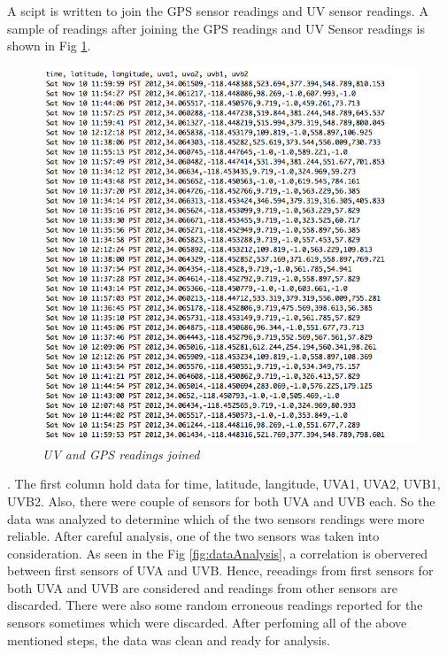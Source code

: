 \documentclass[12pt,fullpage,doublespace]{article}
\begin{document}
A scipt is written to join the GPS sensor readings and UV sensor readings. A sample of readings after joining the GPS readings and UV Sensor readings is shown in Fig \ref{fig:joinedReadings}.\begin{figure}
\begin{center}
\includegraphics[scale=0.45]{joinedReadings.png}
\caption{\small \sl UV and GPS readings joined\label{fig:joinedReadings}}
\end{center}
\end{figure}. The first column hold data for time, latitude, langitude, UVA1, UVA2, UVB1, UVB2. Also, there were couple of sensors for both UVA and UVB each. So the data was analyzed to determine which of the two sensors readings were more reliable. After careful analysis, one of the two sensors was taken into consideration. As seen in the Fig \ref{fig:dataAnalysis}, a correlation is obervered between first sensors of UVA and UVB. Hence, reeadings from first sensors for both UVA and UVB are considered and readings from other sensors are discarded. There were also some random erroneous readings reported for the sensors sometimes which were discarded. After perfoming all of the above mentioned steps, the data was clean and ready for analysis.
\end{document}
